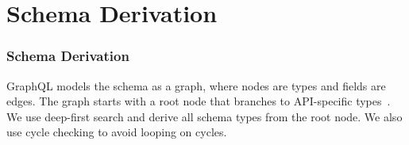 
\section{Schema Derivation} 
\begin{frame}\frametitle{Schema Derivation}

GraphQL models the schema as a graph, where nodes are types and fields are edges. The graph starts with a root node that branches to API-specific types~\cite{migrating-to-gql}.  We use deep-first search and derive all schema types from the root node. We also use cycle checking to avoid looping on cycles.

\end{frame}
